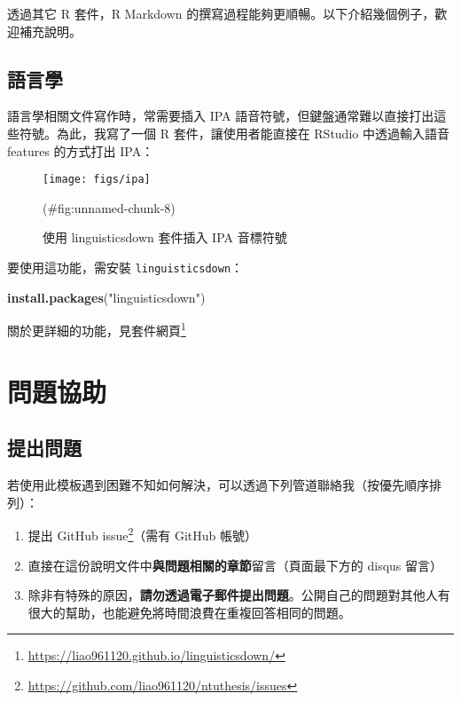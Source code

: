 \documentclass[oneside]{book}
\newenvironment{Shaded}{\begin{snugshade}}{\end{snugshade}}
\newcommand{\KeywordTok}[1]{\textcolor[rgb]{0.13,0.29,0.53}{\textbf{#1}}}
\newcommand{\NormalTok}[1]{#1}
\newcommand{\StringTok}[1]{\textcolor[rgb]{0.31,0.60,0.02}{#1}}
\renewcommand{\href}[2]{#2\footnote{\url{#1}}}
\providecommand{\tightlist}{%
  \setlength{\itemsep}{0pt}\setlength{\parskip}{0pt}}
\begin{document}
透過其它 R 套件，R Markdown 的撰寫過程能夠更順暢。以下介紹幾個例子，歡迎補充說明。

\hypertarget{ling}{%
\section{語言學}\label{ling}}

語言學相關文件寫作時，常需要插入 IPA 語音符號，但鍵盤通常難以直接打出這些符號。為此，我寫了一個 R 套件，讓使用者能直接在 RStudio 中透過輸入語音 features 的方式打出 IPA：

\begin{figure}

{\centering \texttt{[image: figs/ipa]} 

}

\caption{使用 linguisticsdown 套件插入 IPA 音標符號}(\#fig:unnamed-chunk-8)
\end{figure}

要使用這功能，需安裝 \texttt{linguisticsdown}：

\begin{Shaded}
\begin{Highlighting}[]
\KeywordTok{install.packages}\NormalTok{(}\StringTok{"linguisticsdown"}\NormalTok{)}
\end{Highlighting}
\end{Shaded}

關於更詳細的功能，見\href{https://liao961120.github.io/linguisticsdown/}{套件網頁}

\hypertarget{feed-back}{%
\chapter*{問題協助}\label{feed-back}}

\hypertarget{issue}{%
\section*{提出問題}\label{issue}}

若使用此模板遇到困難不知如何解決，可以透過下列管道聯絡我（按優先順序排列）：

\begin{enumerate}
\def\labelenumi{\arabic{enumi}.}
\tightlist
\item
  提出 \href{https://github.com/liao961120/ntuthesis/issues}{GitHub issue}（需有 GitHub 帳號）
\item
  直接在這份說明文件中\textbf{與問題相關的章節}留言（頁面最下方的 disqus 留言）
\item
  除非有特殊的原因，\textbf{請勿透過電子郵件提出問題}。公開自己的問題對其他人有很大的幫助，也能避免將時間浪費在重複回答相同的問題。
\end{enumerate}
\end{document}
